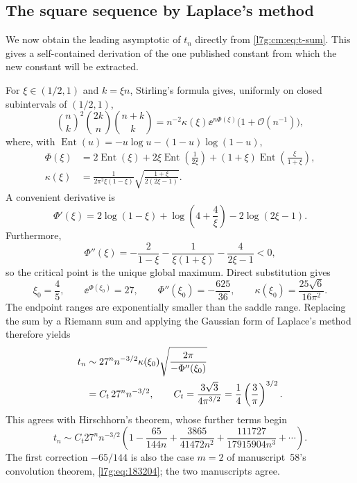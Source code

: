 \documentclass[11pt,letterpaper]{article}
\theoremstyle{remark}\newtheorem{remark}[theorem]{Remark}
\newcommand{\bigO}{\mathcal O}\newcommand{\Ct}{C_{t}}
\newcommand{\Ent}{\operatorname{Ent}}
\newcounter{l7gtrsavedeq}
\begin{document}
\subsection{The square sequence by Laplace's method}\label{l7g:cm:sec:laplace}
We now obtain the leading asymptotic of $t_n$ directly from
\eqref{l7g:cm:eq:t-sum}. This gives a self-contained derivation of the one
published constant from which the new constant will be extracted.

For $\xi\in(1/2,1)$ and $k=\xi n$, Stirling's formula gives, uniformly on
closed subintervals of $(1/2,1)$,
\begin{equation}\label{l7g:cm:eq:laplace-term}
 \binom{n}{k}^{\!2}\binom{2k}{n}\binom{n+k}{k}
 =n^{-2}\kappa(\xi)\ee^{n\Phi(\xi)}\bigl(1+\bigO(n^{-1})\bigr),
\end{equation}
where, with $\Ent(u)=-u\log u-(1-u)\log(1-u)$,
\begin{align}
 \Phi(\xi)
 &=2\Ent(\xi)+2\xi\Ent\!\left(\frac1{2\xi}\right)
 +(1+\xi)\Ent\!\left(\frac{\xi}{1+\xi}\right),\label{l7g:cm:eq:Phi}\\
 \kappa(\xi)
 &=\frac{1}{2\pi^2\xi(1-\xi)}
 \sqrt{\frac{1+\xi}{2(2\xi-1)}}.\label{l7g:cm:eq:g}
\end{align}
A convenient derivative is
\begin{equation}\label{l7g:cm:eq:Phi-prime}
 \Phi'(\xi)=2\log(1-\xi)+\log\!\left(4+\frac4\xi\right)
 -2\log(2\xi-1).
\end{equation}
Furthermore,
\[
 \Phi''(\xi)=-\frac2{1-\xi}-\frac1{\xi(1+\xi)}-\frac4{2\xi-1}<0,
\]
so the critical point is the unique global maximum. Direct substitution
gives
\begin{equation}\label{l7g:cm:eq:saddle-data}
 \xi_0=\frac45,
 \qquad \ee^{\Phi(\xi_0)}=27,
 \qquad \Phi''(\xi_0)=-\frac{625}{36},
 \qquad \kappa(\xi_0)=\frac{25\sqrt6}{16\pi^2}.
\end{equation}
The endpoint ranges are exponentially smaller than the saddle range.
Replacing the sum by a Riemann sum and applying the Gaussian form of
Laplace's method therefore yields
\begin{align}
 t_n
 &\sim 27^n n^{-3/2}\kappa(\xi_0)
 \sqrt{\frac{2\pi}{-\Phi''(\xi_0)}}\notag\\
 &=\Ct\,27^n n^{-3/2},
 \qquad
 \Ct=\frac{3\sqrt3}{4\pi^{3/2}}
 =\frac14\left(\frac3\pi\right)^{3/2}.
 \label{l7g:cm:eq:t-leading}
\end{align}
This agrees with Hirschhorn's theorem, whose further terms begin
\begin{equation}\label{l7g:cm:eq:t-full-known}
 t_n\sim\Ct 27^n n^{-3/2}
 \left(1-\frac{65}{144n}
 +\frac{3865}{41472n^2}
 +\frac{111727}{17915904n^3}+\cdots\right).
\end{equation}
The first correction $-65/144$ is also the case $m=2$ of manuscript~58's
convolution theorem, \eqref{l7g:eq:183204}; the two manuscripts agree.
\end{document}

